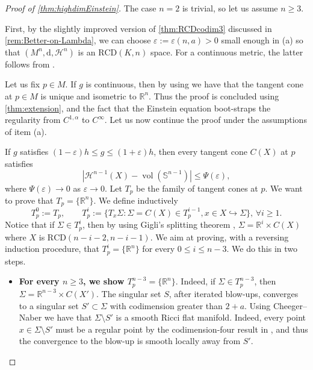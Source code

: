 \documentclass[12pt,a4paper,reqno]{amsart}
\renewcommand{\leq}{\leqslant}
\renewcommand{\geq}{\geqslant}
\DeclareMathOperator{\vol}{vol}
\begin{document}
\begin{proof}[Proof of \cref{thm:highdimEinstein}]
The case $n=2$ is trivial, so let us assume $n\geq 3$. 

First, by the slightly improved version of \cref{thm:RCDcodim3} discussed in \cref{rem:Better-on-Lambda}, we can choose $\varepsilon:=\varepsilon(n,a)>0$ small enough in (a) so that 
$(M^n,\mathrm{d},\mathcal{H}^n)$ is an $\mathrm{RCD}(K,n)$ space. For a continuous metric, the latter follows from \cite[Remark 2.8]{DWWW}. 

Let us fix $p\in M$. If $g$ is continuous, then by using \cite[Lemma 2.5]{AFNP} we have that the tangent cone at $p\in M$ is unique and isometric to $\mathbb R^n$. Thus the proof is concluded using \cref{thm:extension}, and the fact that the Einstein equation boot-straps the regularity from $C^{1,\alpha}$ to $C^\infty$. Let us now continue the proof under the assumptions of item (a).

If $g$ satisfies $(1-\varepsilon)h\leq g\leq (1+\varepsilon)h$, then every tangent cone $C(X)$ at $p$ satisfies 
\begin{equation}\label{eqn:VolumeControl}
|\mathcal{H}^{n-1}(X)-\vol(\mathbb S^{n-1})|\leq \Psi(\varepsilon),
\end{equation} 
where $\Psi(\varepsilon)\to 0$ as $\varepsilon \to 0$. Let $T_p$ be the family of tangent cones at $p$. We want to prove that $T_p=\{\mathbb R^n\}$. We define inductively
\[
T_p^0:=T_p,\quad \quad 
T_p^i:=\{T_x\Sigma:\Sigma=C(X)\in T_p^{i-1}, x\in X\hookrightarrow \Sigma\},\,\forall i\geq 1.
\]
Notice that if $\Sigma\in T_p^i$, then by using Gigli's splitting theorem \cite{GigliSplitting}, $\Sigma=\mathbb R^i\times C(X)$ where $X$ is $\mathrm{RCD}(n-i-2,n-i-1)$. 
We aim at proving, with a reversing induction procedure, that $T_p^i=\{\mathbb R^n\}$ for every $0\leq i\leq n-3$. We do this in two steps.
\begin{itemize}
    \item \textbf{For every $n\geq 3$, we show $T_p^{n-3}=\{\mathbb R^n\}$}. Indeed, if $\Sigma\in T_p^{n-3}$, then $\Sigma=\mathbb R^{n-3}\times C(X')$. The singular set $S$, after iterated blow-ups, converges to a singular set $S'\subset \Sigma$ with codimension greater than $2+a$. Using Cheeger--Naber \cite{CNAnnMath} we have that $\Sigma\setminus S'$ is a smooth Ricci flat manifold. Indeed, every point $x\in \Sigma\setminus S'$ must be a regular point by the codimension-four result in \cite{CNAnnMath}, and thus the convergence to the blow-up is smooth locally away from $S'$. 
    

\end{itemize}
\end{proof}
\end{document}
